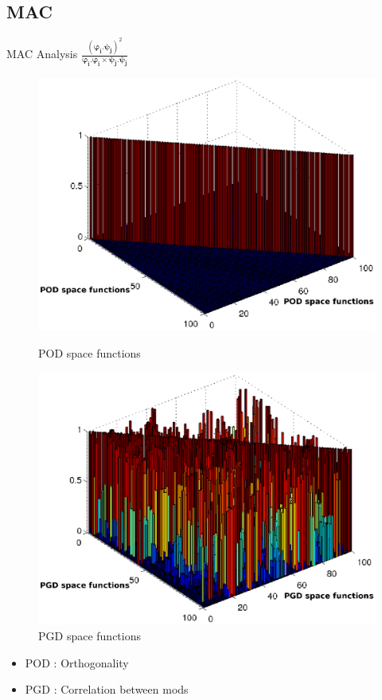 \documentclass[12pt]{beamer}
\begin{document}
\subsection{MAC}

\begin{frame}{MAC Analysis 
	$\frac{\left(\boldsymbol{\varphi_i.\psi_j}\right)^2}{\boldsymbol{\varphi_i.\varphi_i \times \psi_j.\psi_j}}$} 
	\begin{figure}
		\begin{minipage}{0.46\linewidth}
			\includegraphics[width=1\linewidth]{MAC-POD2.eps}
			\caption{\centering POD space functions}		
		\end{minipage}
		 \hspace{0.5cm}
		\begin{minipage}{0.46\linewidth}
			\includegraphics[width=1\linewidth]{MAC-PGD2.eps}
			\caption{\centering PGD space functions}		
		\end{minipage}
	\end{figure}
	\vspace{-0.75cm}
	\begin{itemize}
		\item POD : Orthogonality
			\vspace{-0.2cm}
		\item PGD : Correlation between mods
	\end{itemize}
\end{frame}
\end{document}
